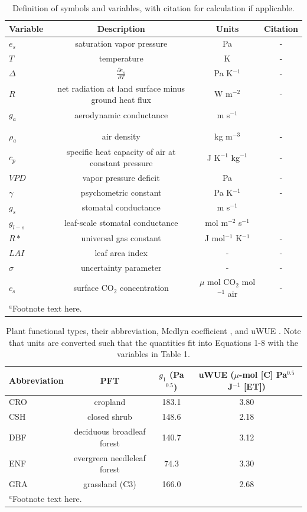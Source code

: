 \documentclass[draft,linenumbers]{agujournal}
\begin{document}
\begin{table}
\caption{Definition of symbols and variables, with citation for calculation if applicable.}
\centering
\begin{tabular}{l c c c}
\hline
 Variable & Description & Units & Citation \\
\hline
$e_s$  & saturation vapor pressure & Pa  & - \\ 
$T$  & temperature  & K & - \\
$\Delta$  & $\frac{\partial e_s}{\partial T}$ & Pa K$^{-1}$ & - \\
$R$  & net radiation at land surface minus ground heat flux & W m$^{-2}$   & - \\
  $g_a$  & aerodynamic conductance & m s$^{-1}$  & \makecell{\cite{Thom_1977} \\ \cite{Paulson_1970} \\ \cite{Beljaars_1991}} \\
  $\rho_a$  & air density & kg m$^{-3}$  & - \\
  $c_p$  & specific heat capacity of air at constant pressure & J K$^{-1}$ kg$^{-1}$ & - \\
  $VPD$  & vapor pressure deficit & Pa  & - \\
  $\gamma$  & psychometric constant & Pa K$^{-1}$   & - \\
  $g_s$  & stomatal conductance & m s$^{-1}$  & \cite{MEDLYN_2011} \\
  $g_{l-s}$  & leaf-scale stomatal conductance & mol m$^{-2}$ s$^{-1}$  & \cite{MEDLYN_2011} \\
  $R*$ & universal gas constant & J mol$^{-1}$ K$^{-1}$ & - \\
  $LAI$ & leaf area index & -& - \\
  $\sigma$ & uncertainty parameter & -& - \\
  $c_s$ & surface CO$_2$ concentration & $\mu$ mol CO$_2$ mol$^{-1}$ air& - \\
\hline
\multicolumn{2}{l}{$^{a}$Footnote text here.}
\end{tabular}
\end{table}

\begin{table}
  \label{pft}
\caption{Plant functional types, their abbreviation, Medlyn coefficient \citep[from ][]{Lin_2015}, and uWUE \citep[from ][]{Zhou_2015}. Note that units are converted such that the quantities fit into Equations 1-8 with the variables in Table 1.}
\centering
\begin{tabular}{l c c c}
  \hline
  Abbreviation & PFT & $g_1$ (Pa$^{0.5}$) & uWUE ($\mu$-mol [C] Pa$^{0.5}$ J$^{-1}$ [ET])  \\
  \hline
  CRO & cropland & 183.1 & 3.80 \\
  CSH & closed shrub & 148.6 & 2.18 \\
  DBF & deciduous broadleaf forest & 140.7 & 3.12 \\
  ENF & evergreen needleleaf forest & 74.3 & 3.30 \\
  GRA & grassland (C3) & 166.0 & 2.68 \\
\hline
\multicolumn{2}{l}{$^{a}$Footnote text here.}
\end{tabular}
\end{table}
\end{document}
